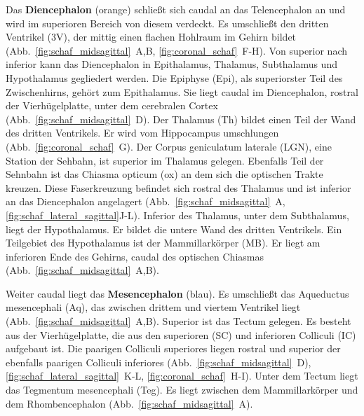 \documentclass[12pt,a4paper,pdftex]{article}
\begin{document}
\noindent Das \textbf{Diencephalon} (orange) schließt sich caudal an das Telencephalon an und wird im superioren Bereich von diesem verdeckt. Es umschließt den dritten Ventrikel (3V), der mittig einen flachen Hohlraum im Gehirn bildet (Abb.~\ref{fig:schaf_midsagittal}~A,B, \ref{fig:coronal_schaf}~F-H). Von superior nach inferior kann das Diencephalon in Epithalamus, Thalamus, Subthalamus und Hypothalamus gegliedert werden. Die Epiphyse (Epi), als superiorster Teil des Zwischenhirns, gehört zum Epithalamus. Sie liegt caudal im Diencephalon, rostral der Vierhügelplatte, unter dem cerebralen Cortex (Abb.~\ref{fig:schaf_midsagittal}~D). Der Thalamus (Th) bildet einen Teil der Wand des dritten Ventrikels. Er wird vom Hippocampus umschlungen (Abb.~\ref{fig:coronal_schaf}~G). Der Corpus geniculatum laterale (LGN), eine Station der Sehbahn, ist superior im Thalamus gelegen. Ebenfalls Teil der Sehnbahn ist das Chiasma opticum (ox) an dem sich die optischen Trakte kreuzen. Diese Faserkreuzung befindet sich rostral des Thalamus und ist inferior an das Diencephalon angelagert (Abb.~\ref{fig:schaf_midsagittal}~A, \ref{fig:schaf_lateral_sagittal}J-L). Inferior des Thalamus, unter dem Subthalamus, liegt der Hypothalamus. Er bildet die untere Wand des dritten Ventrikels. Ein Teilgebiet des Hypothalamus ist der Mammillarkörper (MB). Er liegt am inferioren Ende des Gehirns, caudal des optischen Chiasmas (Abb.~\ref{fig:schaf_midsagittal}~A,B).

\noindent Weiter caudal liegt das \textbf{Mesencephalon} (blau). Es umschließt das Aqueductus mesencephali (Aq), das zwischen drittem und viertem Ventrikel liegt (Abb.~\ref{fig:schaf_midsagittal}~A,B). Superior ist das Tectum gelegen. Es besteht aus der Vierhügelplatte, die aus den superioren (SC) und inferioren Colliculi (IC) aufgebaut ist. Die paarigen Colliculi superiores liegen rostral und superior der ebenfalls paarigen Colliculi inferiores (Abb.~\ref{fig:schaf_midsagittal}~D), \ref{fig:schaf_lateral_sagittal}~K-L, \ref{fig:coronal_schaf}~H-I). Unter dem Tectum liegt das Tegmentum mesencephali (Teg). Es liegt zwischen dem Mammillarkörper und dem Rhombencephalon (Abb.~\ref{fig:schaf_midsagittal}~A).
\end{document}
